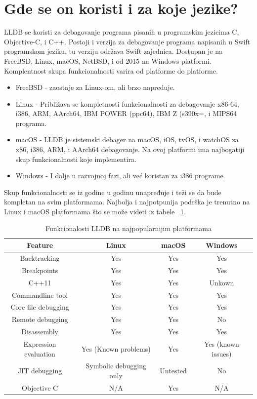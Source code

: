 \documentclass[a4paper]{article}
\begin{document}
\section{Gde se on koristi i za koje jezike? }
\label{sec: Gde se on koristi i za koje jezike?}
LLDB se koristi za debagovanje programa pisanih u programskim jezicima C, Objective-C, i C++. Postoji i verzija za debagovanje programa napisanih u Swift programskom jeziku, tu verziju održava Swift zajednica. 
Dostupan je na FreeBSD, Linux, macOS, NetBSD, i od 2015 na Windows platformi. Komplentnost skupa funkcionalnosti varira od platforme do platforme.
\begin{itemize}
\item FreeBSD - zaostaje za Linux-om, ali brzo napreduje.
\item Linux - Približava se kompletnosti funkcionalnosti za debagovanje x86-64, i386, ARM, AArch64, IBM POWER (ppc64), IBM Z (s390x=, i MIPS64 programa.
\item macOS - LLDB je sistemski debager na macOS, iOS, tvOS, i watchOS za x86, i386, ARM, i AArch64 debagovanje. Na ovoj platformi ima najbogatiji skup funkcionalnosti koje implementira.
\item Windows - I dalje u razvojnoj fazi, ali već koristan za i386 programe.
\end{itemize}
Skup funkcionalnosti se iz godine u godinu unapređuje i teži se da bude kompletan na svim platformama. Najbolja i najpotpunija podrška je trenutno na Linux i macOS platformama što se može videti iz tabele ~\ref{tab:table lldb features}.

\begin{table}[h!]
\center
\caption{Funkcionalosti LLDB na najpopularnijim platformama}
\label{tab:table lldb features}
\begin{tabular}{|c|c c c|} 
 \hline
 Feature & Linux & macOS & Windows \\ [0.5ex] 
 \hline
 Backtracking & Yes & Yes & Yes \\ 
 Breakpoints & Yes & Yes & Yes \\
 C++11 & Yes & Yes & Unkown \\
 Commandline tool & Yes & Yes & Yes \\
 Core file debugging  & Yes & Yes & Yes \\
  Remote debugging & Yes & Yes & No\\ [1ex] 
 Disassembly & Yes & Yes & Yes  \\
 Expression evaluation & Yes (Known problems)& Yes & Yes (known issues) \\
 JIT debugging & Symbolic debugging only & Untested & No \\
 Objective C & N/A & Yes & N/A \\
 \hline
\end{tabular}
\end{table}
\end{document}
